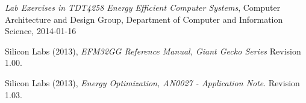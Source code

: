 
\begin{thebibliography}{9}

  \emph{Lab Exercises in TDT4258 Energy Efficient Computer Systems},
  Computer Architecture and Design Group,
  Department of Computer and Information Science,
  2014-01-16

	Silicon Labs (2013),
	\emph{EFM32GG Reference Manual, Giant Gecko Series}
	Revision 1.00.

	Silicon Labs (2013),
	\emph{Energy Optimization, AN0027 - Application Note}.
	Revision 1.03.

\end{thebibliography}

